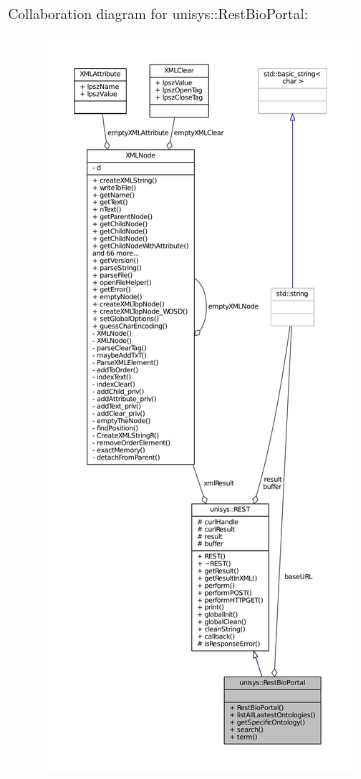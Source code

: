 Collaboration diagram for unisys\-:\-:Rest\-Bio\-Portal\-:
\nopagebreak
\begin{figure}[H]
\begin{center}
\leavevmode
\includegraphics[height=550pt]{classunisys_1_1RestBioPortal__coll__graph}
\end{center}
\end{figure}

